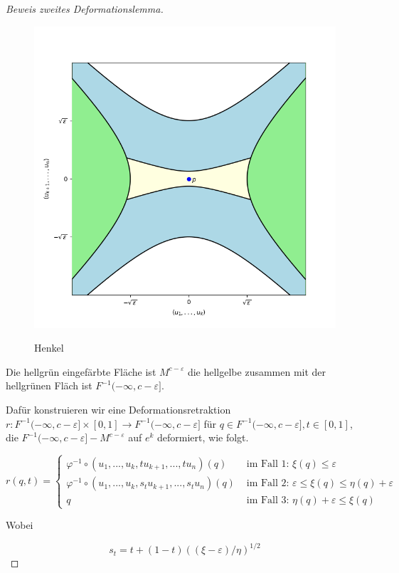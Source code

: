\begin{proof}[Beweis zweites Deformationslemma]
    \begin{figure}[H]
        \centering
        \includegraphics[width=0.8\linewidth]{resources/Me-Diagram7-handle.png}
        \label{fig:me-diagram7}
        \caption{Henkel}
    \end{figure}

    Die hellgrün eingefärbte Fläche ist $M^{c - \varepsilon}$ die hellgelbe
    zusammen mit der hellgrünen Fläch ist $F^{-1}(-\infty, c - \varepsilon]$. 

    Dafür konstruieren wir eine Deformationsretraktion
    $r: F^{-1}(-\infty, c - \varepsilon] \times [0,1] \to F^{-1}(-\infty, c - \varepsilon]$
    für $q \in F^{-1}(-\infty, c - \varepsilon], t \in [0, 1]$, die 
    $F^{-1}(-\infty, c - \varepsilon] - M^{c - \varepsilon}$ auf $e^k$ 
    deformiert, wie folgt.

    \[
        r(q, t) = \begin{cases}
            \varphi^{-1} \circ (u_1, ..., u_k, tu_{k + 1}, ..., tu_n)(q)
                & \text{ im Fall 1: } \xi(q) \leq \varepsilon \\
            \varphi^{-1} \circ (u_1, ..., u_k, s_tu_{k + 1}, ..., s_tu_n)(q)
                & \text{ im Fall 2: } \varepsilon \leq \xi(q) \leq \eta(q) + \varepsilon \\
            q & \text{ im Fall 3: } \eta(q) + \varepsilon \leq \xi(q)
        \end{cases}
    \]

    Wobei 

    \[ s_t = t + (1 -t)((\xi - \varepsilon)/\eta)^{1/2} \]


\end{proof}
